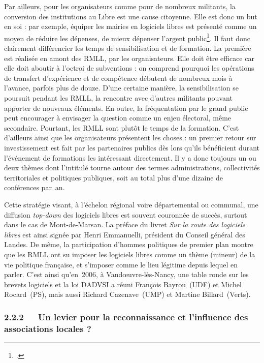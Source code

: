 \documentclass{FramateX}
\begin{document}
\begin{refsection}
Par ailleurs, pour les organisateurs comme pour de nombreux militants,
la conversion des institutions au Libre est une cause citoyenne. Elle
est donc un but en soi : par exemple, équiper les mairies en logiciels
libres est présenté comme un moyen de réduire les dépenses, de mieux
dépenser l'argent
public\footnote{\cite[p.~40]{elieeconomie2009}.}. Il faut donc clairement différencier les temps de
sensibilisation et de formation. La première est réalisée en amont des
RMLL, par les organisateurs. Elle doit être efficace car elle doit
aboutir à l'octroi de subventions : on comprend pourquoi les opérations
de transfert d'expérience et de compétence débutent de nombreux mois à
l'avance, parfois plus de douze. D'une certaine manière, la
sensibilisation se poursuit pendant les RMLL, la rencontre avec
d'autres militants pouvant apporter de nouveaux éléments. En outre, la
fréquentation par le grand public peut encourager à envisager la
question comme un enjeu électoral, même secondaire. Pourtant, les RMLL
sont plutôt le temps de la formation. C'est d'ailleurs ainsi que les
organisateurs présentent les choses : un premier retour sur
investissement est fait par les partenaires publics dès lors qu'ils
bénéficient durant l'événement de formations les intéressant
directement. Il y a donc toujours un ou deux thèmes dont l'intitulé
tourne autour des termes administrations, collectivités territoriales
et politiques publiques, soit au total plus d'une dizaine de
conférences par~an.

Cette stratégie visant, à l'échelon régional voire départemental ou
communal, une diffusion \textit{top-down} des logiciels libres est
souvent couronnée de succès, surtout dans le cas de Mont-de-Marsan. La
préface du livret \textit{Sur la route des logiciels libres} est ainsi
signée par Henri Emmanuelli, président du Conseil général des Landes.
De même, la participation d'hommes politiques de premier plan montre
que les RMLL ont su imposer les logiciels libres comme un thème
(mineur) de la vie politique française, et s'imposer comme le lieu
légitime depuis lequel en parler. C'est ainsi qu'en~2006, à
Vandœuvre-lès-Nancy, une table ronde sur les brevets logiciels et la
loi DADVSI a réuni François Bayrou~(UDF) et Michel Rocard~(PS), mais
aussi Richard Cazenave~(UMP) et Martine Billard~(Verts).

\subsubsection*{2.2.2~~~Un levier pour la reconnaissance et l'influence des associations locales ?}
{}


\end{refsection}
\end{document}
